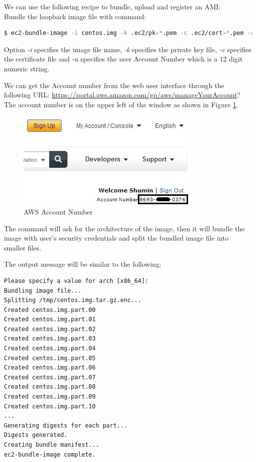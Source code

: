 We can use the following recipe to bundle, upload and register an AMI: \\
Bundle the loopback image file with command:
\lstset{style=bashstyle}
\begin{lstlisting}[language=bash]
$ ec2-bundle-image -i centos.img -k .ec2/pk-*.pem -c .ec2/cert-*.pem -u 123412341234
\end{lstlisting}

Option \emph{-i} specifies the image file name, \emph{-k} specifies the private key file, \emph{-c} specifies the certificate file and -u specifies the user Account Number which is a 12 digit numeric string.

We can get the Account number from the web user interface through the following URL: \url{https://portal.aws.amazon.com/gp/aws/manageYourAccount}? The account number is on the upper left of the window as shown in Figure \ref{fig:aws.account.number}.
\begin{figure}[ht]
  \centering
  \includegraphics[width=.50\textwidth]{figs/5163os_08_16.png}
  \caption{AWS Account Number}\label{fig:aws.account.number}
\end{figure} 
The command will ask for the architecture of the image, then it will bundle the image with user's security credentials and split the bundled image file into smaller files.

The output message will be similar to the following:
\lstset{style=bashstyle}
\begin{lstlisting}
Please specify a value for arch [x86_64]:
Bundling image file...
Splitting /tmp/centos.img.tar.gz.enc...
Created centos.img.part.00
Created centos.img.part.01
Created centos.img.part.02
Created centos.img.part.03
Created centos.img.part.04
Created centos.img.part.05
Created centos.img.part.06
Created centos.img.part.07
Created centos.img.part.08
Created centos.img.part.09
Created centos.img.part.10
...
Generating digests for each part...
Digests generated.
Creating bundle manifest...
ec2-bundle-image complete.
\end{lstlisting}

